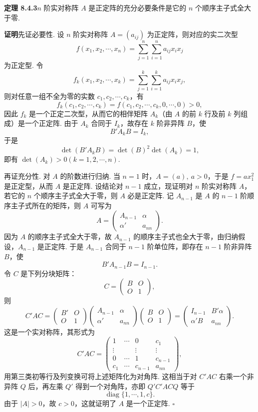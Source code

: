 \documentclass[UTF8, 12pt, fontset=fandol, oneside]{ctexart}
\begin{document}
\noindent\textbf{定理 8.4.3}\quad $n$ 阶实对称阵 $A$ 是正定阵的充分必要条件是它的 $n$ 个顺序主子式全大于零.

\noindent\textbf{证明}\quad 先证必要性. 设 $n$ 阶实对称阵 $A=(a_{ij})$ 为正定阵，则对应的实二次型
\[
f(x_1,x_2,\cdots,x_n)=\sum_{j=1}^n\sum_{i=1}^n a_{ij}x_ix_j
\]
为正定型. 令
\[
f_k(x_1,x_2,\cdots,x_k)=\sum_{j=1}^k\sum_{i=1}^k a_{ij}x_ix_j,
\]
则对任意一组不全为零的实数 $c_1,c_2,\cdots,c_k$，有
\[
f_k(c_1,c_2,\cdots,c_k)=f(c_1,c_2,\cdots,c_k,0,\cdots,0)>0,
\]
因此 $f_k$ 是一个正定二次型，从而它的相伴矩阵 $A_k$（由 $A$ 的前 $k$ 行及前 $k$ 列组成）是一个正定阵. 由于 $A_k$ 合同于 $I_k$，故存在 $k$ 阶非异阵 $B$，使
\[
B'A_kB=I_k,
\]
于是
\[
\det(B'A_kB)=\det(B)^2\det(A_k)=1,
\]
即有 $\det(A_k)>0(k=1,2,\cdots,n)$.

再证充分性. 对 $A$ 的阶数进行归纳. 当 $n=1$ 时，$A=(a),\ a>0$，于是 $f=ax_1^2$ 是正定型，从而 $A$ 是正定阵. 设结论对 $n-1$ 成立，现证明对 $n$ 阶实对称阵 $A$，若它的 $n$ 个顺序主子式全大于零，则 $A$ 必是正定阵. 记 $A_{n-1}$ 是 $A$ 的 $n-1$ 阶顺序主子式所在的矩阵，则 $A$ 可写为
\[
A=\left(\begin{array}{cc}A_{n-1}&\alpha\\ \alpha'&a_{nn}\end{array}\right).
\]
因为 $A$ 的顺序主子式全大于零，故 $A_{n-1}$ 的顺序主子式也全大于零，由归纳假设，$A_{n-1}$ 是正定阵. 于是 $A_{n-1}$ 合同于 $n-1$ 阶单位阵，即存在 $n-1$ 阶非异阵 $B$，使
\[
B'A_{n-1}B=I_{n-1}.
\]
令 $C$ 是下列分块矩阵：
\[
C=\left(\begin{array}{cc}B&O\\ O&1\end{array}\right),
\]
则
\[
C'AC=\left(\begin{array}{cc}B'&O\\ O&1\end{array}\right)
\left(\begin{array}{cc}A_{n-1}&\alpha\\ \alpha'&a_{nn}\end{array}\right)
\left(\begin{array}{cc}B&O\\ O&1\end{array}\right)
=\left(\begin{array}{cc}I_{n-1}&B'\alpha\\ \alpha'B&a_{nn}\end{array}\right).
\]
这是一个实对称阵，其形式为
\[
C'AC=\left(\begin{array}{ccccc}
1&\cdots&0&c_1\\
\vdots&&\vdots&\vdots\\
0&\cdots&1&c_{n-1}\\
c_1&\cdots&c_{n-1}&a_{nn}
\end{array}\right),
\]
用第三类初等行及列变换可将上述矩阵化为对角阵. 这相当于对 $C'AC$ 右乘一个非异阵 $Q$ 后，再左乘 $Q'$ 得到一个对角阵，亦即 $Q'C'ACQ$ 等于
\[
\operatorname{diag}\{1,\cdots,1,c\}.
\]
由于 $|A|>0$，故 $c>0$，这就证明了 $A$ 是一个正定阵. $\square$
\end{document}
